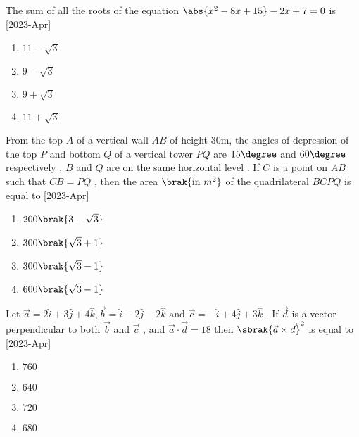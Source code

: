     \item The sum of all the roots of the equation $\abs{ x^2 - 8x + 15} - 2x +7 = 0$ is \hfill[2023-Apr]
    \begin{multicols}{2}
        \begin{enumerate}
            \item $11 - \sqrt{3}$
            \item $9 - \sqrt{3}$
            \item $9 + \sqrt{3}$
            \item $11 + \sqrt{3}$
        \end{enumerate}
    \end{multicols}
    \item From the top $A$ of a vertical wall $AB$ of height $30\text{m}$, the angles of depression of the top $P$ and bottom $Q$ of a vertical tower $PQ$ are $15\degree$ and $60\degree$ respectively , $B$ and $Q$ are on the same horizontal level . If $C$ is a point on $AB$ such that $ CB = PQ $ , then the area $\brak{\text{in } m^2}$ of the quadrilateral $BCPQ$ is equal to \hfill[2023-Apr]
    \begin{multicols}{2}
        \begin{enumerate}
            \item $200\brak{3-\sqrt{3}}$
            \item $300\brak{\sqrt{3}+1}$\\
            \item $300\brak{\sqrt{3}-1}$
            \item $600\brak{\sqrt{3}-1}$
        \end{enumerate}
    \end{multicols}
    \item Let $\vec{a} = 2\hat{i}+3\hat{j}+4\hat{k} , \vec{b} = \hat{i} - 2\hat{j} - 2\hat{k} \text{ and } \vec{c} = -\hat{i} + 4\hat{j} + 3\hat{k}$ . If $\vec{d}$ is a vector perpendicular to both $\vec{b}$ and $\vec{c}$ , and $\vec{a}\cdot \vec{d} = 18$ then $\sbrak{\vec{a}\times\vec{d}}^2$ is equal to \hfill[2023-Apr]
    \begin{multicols}{2}
        \begin{enumerate}
            \item $760$
            \item $640$
            \item $720$
            \item $680$
        \end{enumerate}
    \end{multicols}
